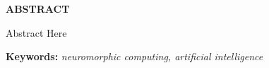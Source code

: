 \begin{center}
{\bf ABSTRACT}\\[36pt]
\end{center}
{\baselineskip

Abstract Here

}
\bigskip
\textbf{Keywords:} \textit{neuromorphic computing, artificial intelligence}
